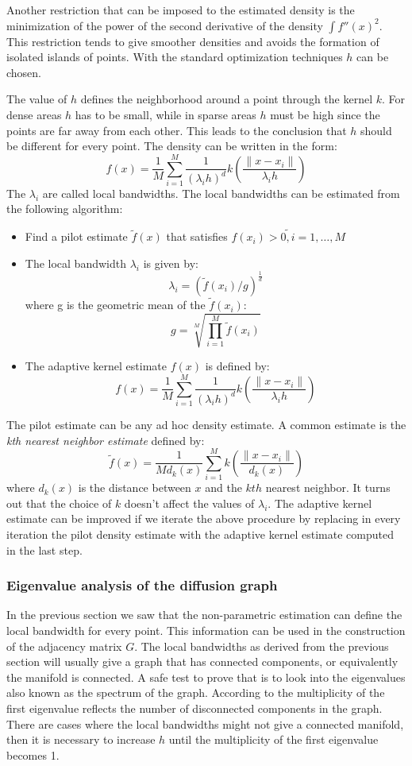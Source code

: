 \documentclass[12pt,letterpaper,doublespaced,ETD,dvips,proposal]{gtthesis}
\begin{document}
\begin{Body}
Another restriction that can be imposed to the estimated density is
the minimization of the power of the second derivative of the
density $\int f''(x)^2$. This restriction tends to give smoother
densities and avoids the formation of isolated islands of points.
With the standard optimization techniques $h$ can be chosen.

The value of $h$ defines the neighborhood around a point through the
kernel $k$. For dense areas $h$ has to be small, while in sparse
areas $h$ must be high since the points are far away from each
other. This leads to the conclusion that $h$ should be different for
every point. The density can be written in the form:
\[
    f(x)=\frac{1}{M}\sum_{i=1}^{M}\frac{1}{(\lambda_i h)^d}k(\frac{\parallel x-x_i
\parallel}{\lambda_i h})
\]
The $\lambda_i$ are called local bandwidths. The local bandwidths
can be estimated from the following algorithm:
\begin{itemize}
    \item Find a pilot estimate $\tilde{f}(x)$ that satisfies
         $\tilde{f(x_i)>0, i=1,\dots,M}$
    \item The local bandwidth $\lambda_i$ is given by:
        \[
            \lambda_i=(\tilde{f}(x_i)/g)^{\frac{1}{d}}
        \]
        where g is the geometric mean  of the $\tilde{f}(x_i)$:
        \[
            g=\sqrt[M]{\prod_{i=1}^{M}\tilde{f}(x_i)}
        \]
    \item The adaptive kernel estimate $f(x)$ is defined by:
         \[
            f(x)=\frac{1}{M}\sum_{i=1}^{M}\frac{1}{(\lambda_i
            h)^d} k\left( \frac{\parallel x-x_i \parallel}{\lambda_i h} \right)
        \]
\end{itemize}
The pilot estimate can be any ad hoc density estimate. A common
estimate is the \emph{kth  nearest neighbor estimate} defined by:
    \[
        \tilde{f}(x)=\frac{1}{Md_k(x)}\sum_{i=1}^{M}k\left(\frac{
        \parallel x-x_i \parallel}{d_k(x)}\right)
    \]
where $d_k(x)$ is the distance between $x$ and the $kth$ nearest
neighbor. It turns out that the choice of $k$ doesn't affect the
values of $\lambda_i$. The adaptive kernel estimate can be improved
if we iterate the above procedure by replacing in every iteration
the pilot density estimate with the adaptive kernel estimate
computed in the last step.
\subsubsection{Eigenvalue analysis of the diffusion graph}
In the previous section we saw that the
non-parametric estimation can  define the local bandwidth for every
point. This information can be used in the construction of the
adjacency matrix $G$. The local bandwidths as derived from the
previous section will usually give a graph that has connected
components, or equivalently the manifold is connected. A  safe test
to prove that is to look into the eigenvalues also known as the
spectrum of the graph. According to \cite{Cvetkovic} the
multiplicity of the first eigenvalue reflects the number of
disconnected components in the graph. There are cases where the
local bandwidths might not give a connected manifold, then it is
necessary to increase $h$ until the multiplicity of the first
eigenvalue becomes 1.


\end{Body}
\end{document}
